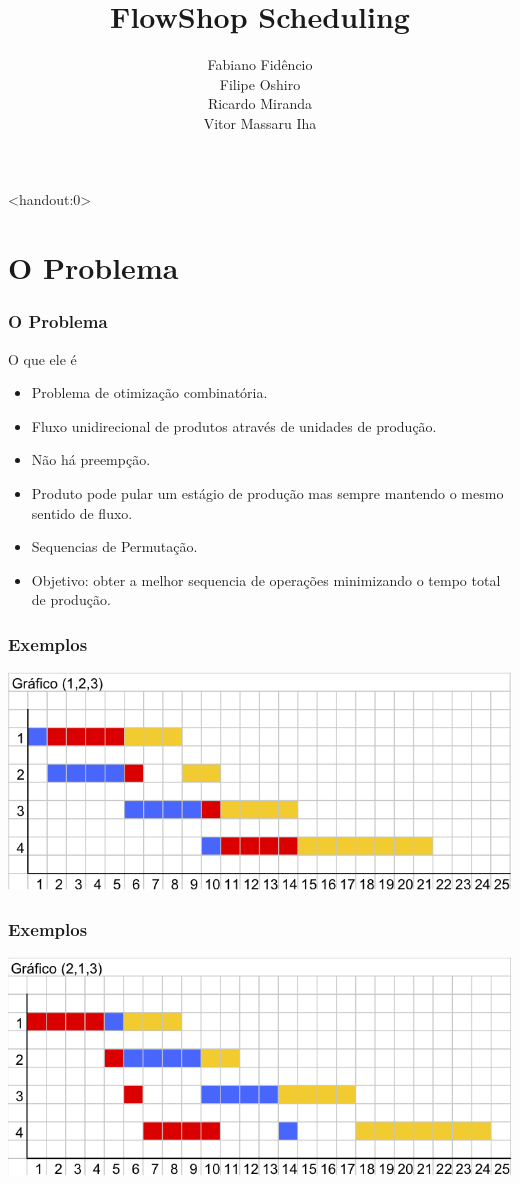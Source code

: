 \documentclass[12pt]{beamer}
\title{FlowShop Scheduling}
\author[Fidêncio,Oshiro,Miranda,Iha]{Fabiano Fidêncio\\ Filipe Oshiro\\ Ricardo Miranda\\ Vitor Massaru Iha}
\institute[IC-UNICAMP]{Instituto de Computação - UNICAMP}
\begin{document}
\begin{frame}<handout:0>
	\titlepage 
\end{frame}


\section{O Problema}
\begin{frame}
	\frametitle{O Problema}
	\begin{block}{O que ele é}
		\begin{itemize}
			\item Problema de otimização combinatória.	\pause
			\item Fluxo unidirecional de produtos através de unidades de produção. 	\pause
			\item Não há preempção.	\pause
			\item Produto pode pular um estágio de produção mas sempre mantendo o mesmo sentido de fluxo. \pause
			\item Sequencias de Permutação.	\pause
			\item Objetivo: obter a melhor sequencia de operações minimizando o tempo total de produção. \pause

		\end{itemize}
	\end{block}
\end{frame}
\begin{frame}
	\frametitle{Exemplos}
	\includegraphics[scale=.6]{graph1} 
\end{frame}
\begin{frame}
	\frametitle{Exemplos}
	\includegraphics[scale=.6]{graph2} 
\end{frame}
\end{document}
